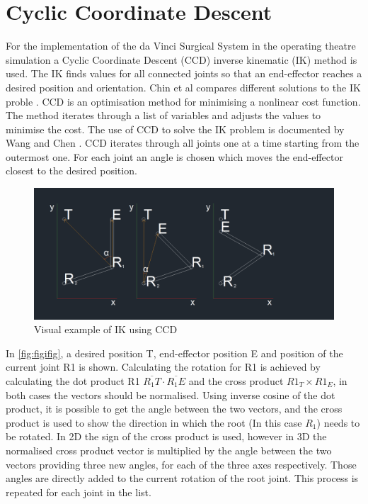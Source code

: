 \chapter{Cyclic Coordinate Descent}
For the implementation of the da Vinci Surgical System in the operating theatre simulation a Cyclic Coordinate Descent (CCD) inverse kinematic (IK) method is used. The IK finds values for all connected joints so that an end-effector reaches a desired position and orientation. Chin et al compares different solutions to the IK proble \citep{kwan_wu_chin_closed-form_1997}. CCD is an optimisation method for minimising a nonlinear cost function. The method iterates through a list of variables and adjusts the values to minimise the cost. The use of CCD to solve the IK problem is documented by Wang and Chen \citep{wang_combined_1991-1}. CCD iterates through all joints one at a time starting from the outermost one. For each joint an angle is chosen which moves the end-effector closest to the desired position.
\begin{figure}[h]
\centering
\includegraphics[width=\textwidth]{CCD/IKCCD.png}
\caption{Visual example of IK using CCD }
\label{fig:figifig}
\end{figure}

In \autoref{fig:figifig}, a desired position T, end-effector position E and position of the current joint R1 is shown. Calculating the rotation for R1 is achieved by calculating the dot product R1 $\overline{R_1T} \cdot \overline{R_1E}$  and the cross product $R1_T \times R1_E$, in both cases the vectors should be normalised. Using inverse cosine of the dot product, it is possible to get the angle between the two vectors, and the cross product is used to show the direction in which the root (In this case $R_1$) needs to be rotated. In 2D the sign of the cross product is used, however in 3D the normalised cross product vector is multiplied by the angle between the two vectors providing three new angles, for each of the three axes respectively. Those angles are directly added to the current rotation of the root joint. This process is repeated for each joint in the list.


